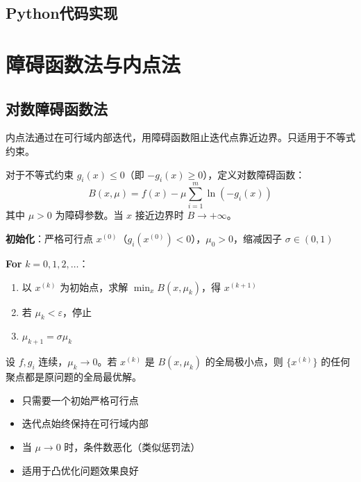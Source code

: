 \subsection{Python代码实现}\label{sec:penalty-code}

\section{障碍函数法与内点法}\label{sec:interior}

\subsection{对数障碍函数法}

\begin{conceptbox}[内点法思想]
内点法通过在可行域内部迭代，用障碍函数阻止迭代点靠近边界。只适用于不等式约束。
\end{conceptbox}

\begin{definition}[对数障碍函数]
对于不等式约束 $g_i(x) \leq 0$（即 $-g_i(x) \geq 0$），定义对数障碍函数：
\[
B(x, \mu) = f(x) - \mu \sum_{i=1}^m \ln(-g_i(x))
\]
其中 $\mu > 0$ 为障碍参数。当 $x$ 接近边界时 $B \to +\infty$。
\end{definition}

\begin{algobox}[对数障碍法]
\textbf{初始化}：严格可行点 $x^{(0)}$（$g_i(x^{(0)}) < 0$），$\mu_0 > 0$，缩减因子 $\sigma \in (0,1)$

\textbf{For} $k = 0, 1, 2, \ldots$：
\begin{enumerate}
    \item 以 $x^{(k)}$ 为初始点，求解 $\min_x B(x, \mu_k)$，得 $x^{(k+1)}$
    \item 若 $\mu_k < \varepsilon$，停止
    \item $\mu_{k+1} = \sigma \mu_k$
\end{enumerate}
\end{algobox}

\begin{theorem}[收敛性]
设 $f, g_i$ 连续，$\mu_k \to 0$。若 $x^{(k)}$ 是 $B(x, \mu_k)$ 的全局极小点，则 $\{x^{(k)}\}$ 的任何聚点都是原问题的全局最优解。
\end{theorem}

\begin{notebox}[障碍函数法的特点]
\begin{itemize}
    \item 只需要一个初始严格可行点
    \item 迭代点始终保持在可行域内部
    \item 当 $\mu \to 0$ 时，条件数恶化（类似惩罚法）
    \item 适用于凸优化问题效果良好
\end{itemize}
\end{notebox}

